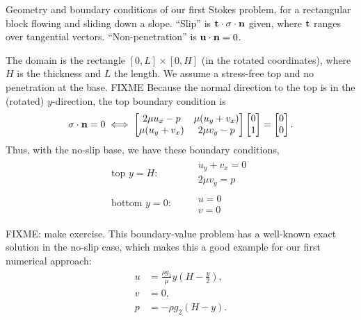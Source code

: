 \begin{marginfigure}

\caption{Geometry and boundary conditions of our first Stokes problem, for a rectangular block flowing and sliding down a slope.  ``Slip'' is $\mathbf{t} \cdot \sigma \cdot \mathbf{n}$ given, where $\mathbf{t}$ ranges over tangential vectors.  ``Non-penetration'' is $\mathbf{u}\cdot\mathbf{n}=0$.}
\label{fig:ok:slabonslope}
\end{marginfigure}

The domain is the rectangle $[0,L]\times[0,H]$ (in the rotated coordinates), where $H$ is the thickness and $L$ the length.  We assume a stress-free top and no penetration at the base.  FIXME  Because the normal direction to the top is in the (rotated) $y$-direction, the top boundary condition is
  $$\sigma\cdot\mathbf{n} = 0 \iff
\begin{bmatrix}
2 \mu u_x - p & \mu (u_y+v_x) \\
\mu (u_y+v_x) & 2 \mu v_y - p
\end{bmatrix} \begin{bmatrix}
0 \\ 1
\end{bmatrix} = \begin{bmatrix}
0 \\ 0
\end{bmatrix}.$$
Thus, with the no-slip base, we have these boundary conditions,
\begin{align}
\text{top $y=H$:}&    & &\begin{array}{l} u_y + v_x = 0 \\ 2 \mu v_y = p\end{array}  \label{eq:ok:bcstokestop} \\
\text{bottom $y=0$:}& & &\begin{array}{l} u = 0 \\ v = 0 \end{array} \label{eq:ok:bcstokesbottom}
\end{align}

FIXME: make exercise.  This boundary-value problem has a well-known exact solution in the no-slip case, which makes this a good example for our first numerical approach:
\begin{align}
u &= \frac{\rho g_1}{\mu} y \left(H - \frac{y}{2}\right), \label{eq:ok:exactstokesu} \\
v &= 0, \label{eq:ok:exactstokesv} \\
p &= - \rho g_2 (H-y).\label{eq:ok:exactstokesp}
\end{align}


